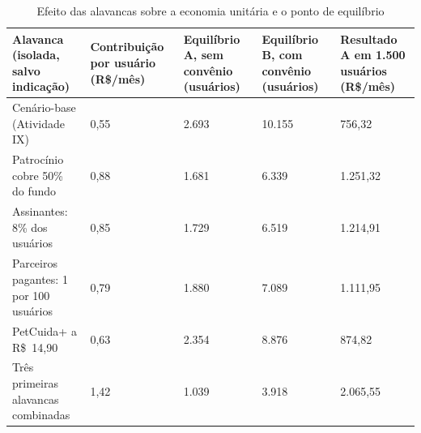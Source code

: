 \begin{table}[htb]
\centering
\caption{Efeito das alavancas sobre a economia unitária e o ponto de equilíbrio}
\label{tab:alavancas}
\begin{tabularx}{\textwidth}{Y L{2.3cm} L{2.6cm} L{2.6cm} L{2.6cm}}
\toprule
\textbf{Alavanca (isolada, salvo indicação)} & \textbf{Contribuição por usuário (R\$/mês)} & \textbf{Equilíbrio A, sem convênio (usuários)} & \textbf{Equilíbrio B, com convênio (usuários)} & \textbf{Resultado A em 1.500 usuários (R\$/mês)}\\
\midrule
Cenário-base (Atividade IX) & 0,55 & 2.693 & 10.155 & 756,32\\
Patrocínio cobre 50\% do fundo & 0,88 & 1.681 & 6.339 & 1.251,32\\
Assinantes: 8\% dos usuários & 0,85 & 1.729 & 6.519 & 1.214,91\\
Parceiros pagantes: 1 por 100 usuários & 0,79 & 1.880 & 7.089 & 1.111,95\\
PetCuida+ a R\$~14,90 & 0,63 & 2.354 & 8.876 & 874,82\\
Três primeiras alavancas combinadas & 1,42 & 1.039 & 3.918 & 2.065,55\\
\bottomrule
\end{tabularx}
\end{table}
